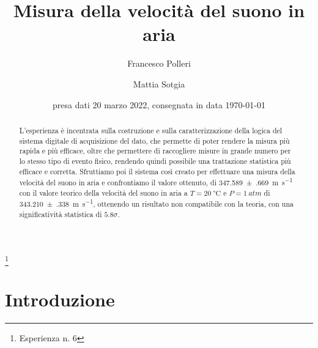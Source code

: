 \documentclass[
    rmp,
    reprint, 
    superscriptaddress, 
    altaffilletter, 
    amsmath, 
    amssymb, 
    a4paper,
    varvw]{revtex4-2}
\begin{document}
\title{Misura della velocità del suono in aria
}
\thanks{Esperienza n. 6
}

\author{Francesco Polleri}
\author{Mattia Sotgia}


\date{presa dati
    20 marzo 2022, consegnata in data 
    \today
}

\begin{abstract}
    L'esperienza è incentrata sulla costruzione e sulla caratterizzazione della logica del sistema digitale di acquisizione del dato, che permette di poter rendere la misura più rapida e più efficace, oltre che permettere di raccogliere misure in grande numero per lo stesso tipo di evento fisico, rendendo quindi possibile una trattazione statistica più efficace e corretta. Sfruttiamo poi il sistema così creato per effettuare una misura della velocità del suono in aria e confrontiamo il valore ottenuto, di \SI{347.589(669)}{\metre\per\second} con il valore teorico della velocità del suono in aria a $T=\SI{20}{\celsius}$ e $P=\SI{1}{atm}$ di \SI{343.210(338)}{\metre\per\second}, ottenendo un risultato non compatibile con la teoria, con una significatività statistica di $5.8\sigma$.
\end{abstract}

\maketitle
\thispagestyle{fancy}




\section{Introduzione}
\end{document}
